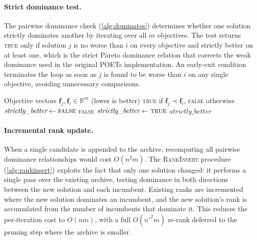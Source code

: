 \documentclass[12pt]{article}
\begin{document}
\paragraph{Strict dominance test.}
The pairwise dominance check (\cref{alg:dominates}) determines whether one solution strictly dominates another by iterating over all $m$ objectives.
The test returns \textsc{true} only if solution $j$ is no worse than $i$ on every objective and strictly better on at least one, which is the strict Pareto dominance relation that corrects the weak dominance used in the original POETs implementation.
An early-exit condition terminates the loop as soon as $j$ is found to be worse than $i$ on any single objective, avoiding unnecessary comparisons.

\begin{algorithm}[H]
\caption{\textsc{StrictlyDominates}$(\mathbf{f}_j, \mathbf{f}_i, m)$: Does solution $j$ strictly dominate solution $i$?}\label{alg:dominates}
\begin{algorithmic}[1]
\Require Objective vectors $\mathbf{f}_j, \mathbf{f}_i \in \mathbb{R}^m$ (lower is better)
\Ensure \textsc{true} if $\mathbf{f}_j \prec \mathbf{f}_i$, \textsc{false} otherwise
\State $\textit{strictly\_better} \gets \textsc{false}$
    \State \Return \textsc{false}
    \State $\textit{strictly\_better} \gets \textsc{true}$
  \EndIf
\EndFor
\State \Return $\textit{strictly\_better}$
\end{algorithmic}
\end{algorithm}

\paragraph{Incremental rank update.}
When a single candidate is appended to the archive, recomputing all pairwise dominance relationships would cost $O(n^2 m)$.
The \textsc{RankInsert} procedure (\cref{alg:rankinsert}) exploits the fact that only one solution changed: it performs a single pass over the existing archive, testing dominance in both directions between the new solution and each incumbent.
Existing ranks are incremented where the new solution dominates an incumbent, and the new solution's rank is accumulated from the number of incumbents that dominate it.
This reduces the per-iteration cost to $O(nm)$, with a full $O(n'^2 m)$ re-rank deferred to the pruning step where the archive is smaller.
\end{document}
